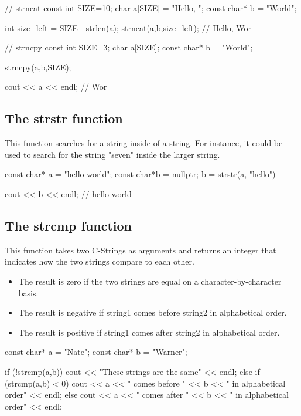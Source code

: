\documentclass{report}
\begin{document}
    \begin{cppcode}
// strncat
const int SIZE=10;
char a[SIZE] = "Hello, ";
const char* b = "World";

int size_left = SIZE - strlen(a);
strncat(a,b,size_left); // Hello, Wor

// strncpy
const int SIZE=3;
char a[SIZE];
const char* b = "World";

strncpy(a,b,SIZE);

cout << a << endl; // Wor
    \end{cppcode}
    

    \bigbreak \noindent 
    \subsection{The strstr function}
    \bigbreak \noindent 
    This function searches for a string inside of a string. For instance, it could be used to search for the string "seven" inside the larger string.
    \bigbreak \noindent 
    
    \begin{cppcode}
const char* a = "hello world";
const char*b = nullptr;
b = strstr(a, "hello")

cout << b << endl; // hello world
    \end{cppcode}
    
    \bigbreak \noindent 
    \bigbreak \noindent 

    \pagebreak \bigbreak \noindent 
    \subsection{The strcmp function}
    \bigbreak \noindent 
    This function takes two C-Strings as arguments and returns an integer that indicates how the two strings compare to each other. 
    \begin{itemize}
        \item The result is zero if the two strings are equal on a character-by-character basis.
        \item The result is negative if string1 comes before string2 in alphabetical order.
        \item The result is positive if string1 comes after string2 in alphabetical order.
    \end{itemize}
    \bigbreak \noindent 
    
    \begin{cppcode}
const char* a = "Nate";
const char* b = "Warner";

if (!strcmp(a,b)) {
    cout << "These strings are the same" << endl;
} else if (strcmp(a,b) < 0) {
    cout << a << " comes before " << b << " in alphabetical order" << endl;
} else {
    cout << a << " comes after " << b << " in alphabetical order" << endl;
}
    \end{cppcode}
    
\end{document}
